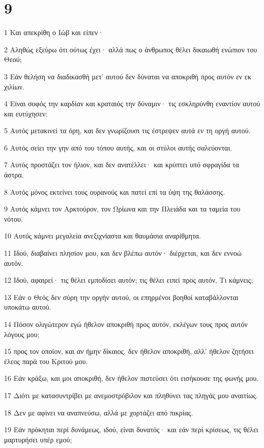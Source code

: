 \chapter{9}

\par 1 Και απεκρίθη ο Ιώβ και είπεν·
\par 2 Αληθώς εξεύρω ότι ούτως έχει· αλλά πως ο άνθρωπος θέλει δικαιωθή ενώπιον του Θεού;
\par 3 Εάν θελήση να διαδικασθή μετ' αυτού δεν δύναται να αποκριθή προς αυτόν εν εκ χιλίων.
\par 4 Είναι σοφός την καρδίαν και κραταιός την δύναμιν· τις εσκληρύνθη εναντίον αυτού και ευτύχησεν;
\par 5 Αυτός μετακινεί τα όρη, και δεν γνωρίζουσι τις έστρεψεν αυτά εν τη οργή αυτού.
\par 6 Αυτός σείει την γην από του τόπου αυτής, και οι στύλοι αυτής σαλεύονται.
\par 7 Αυτός προστάζει τον ήλιον, και δεν ανατέλλει· και κρύπτει υπό σφραγίδα τα άστρα.
\par 8 Αυτός μόνος εκτείνει τους ουρανούς και πατεί επί τα ύψη της θαλάσσης.
\par 9 Αυτός κάμνει τον Αρκτούρον, τον Ωρίωνα και την Πλειάδα και τα ταμεία του νότου.
\par 10 Αυτός κάμνει μεγαλεία ανεξιχνίαστα και θαυμάσια αναρίθμητα.
\par 11 Ιδού, διαβαίνει πλησίον μου, και δεν βλέπω αυτόν· διέρχεται, και δεν εννοώ αυτόν.
\par 12 Ιδού, αφαιρεί· τις θέλει εμποδίσει αυτόν; τις θέλει ειπεί προς αυτόν, Τι κάμνεις;
\par 13 Εάν ο Θεός δεν σύρη την οργήν αυτού, οι επηρμένοι βοηθοί καταβάλλονται υποκάτω αυτού.
\par 14 Πόσον ολιγώτερον εγώ ήθελον αποκριθή προς αυτόν, εκλέγων τους προς αυτόν λόγους μου;
\par 15 προς τον οποίον, και αν ήμην δίκαιος, δεν ήθελον αποκριθή, αλλ' ήθελον ζητήσει έλεος παρά του Κριτού μου.
\par 16 Εάν κράξω, και μοι αποκριθή, δεν ήθελον πιστεύσει ότι εισήκουσε της φωνής μου.
\par 17 Διότι με κατασυντρίβει με ανεμοστρόβιλον και πληθύνει τας πληγάς μου αναιτίως.
\par 18 Δεν με αφίνει να αναπνεύσω, αλλά με χορτάζει από πικρίας.
\par 19 Εάν πρόκηται περί δυνάμεως, ιδού, είναι δυνατός· και εάν περί κρίσεως, τις θέλει μαρτυρήσει υπέρ εμού;
